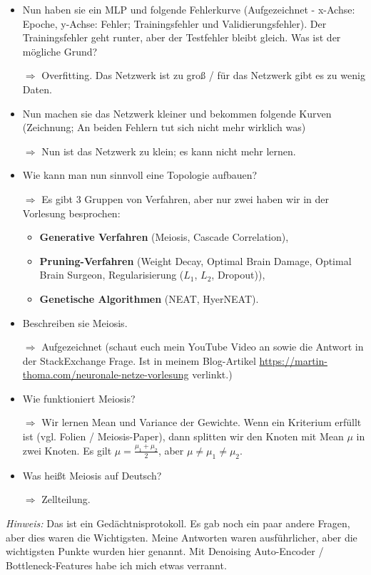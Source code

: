 \documentclass[a4paper]{article}
\begin{document}
\pagebreak
    \begin{itemize}
        \item Nun haben sie ein MLP und folgende Fehlerkurve (Aufgezeichnet - x-Achse: Epoche, y-Achse: Fehler; Trainingsfehler und Validierungsfehler). Der Trainingsfehler
              geht runter, aber der Testfehler bleibt gleich. Was ist der mögliche Grund?
        \item[$\Rightarrow$] Overfitting. Das Netzwerk ist zu groß / für das
                             Netzwerk gibt es zu wenig Daten.
        \item Nun machen sie das Netzwerk kleiner und bekommen folgende Kurven
              (Zeichnung; An beiden Fehlern tut sich nicht mehr wirklich was)
        \item[$\Rightarrow$] Nun ist das Netzwerk zu klein; es kann nicht mehr
                             lernen.
        \item Wie kann man nun sinnvoll eine Topologie aufbauen?
        \item[$\Rightarrow$] Es gibt 3 Gruppen von Verfahren, aber nur zwei
                             haben wir in der Vorlesung besprochen:
             \begin{itemize}
                 \item \textbf{Generative Verfahren} (Meiosis, Cascade Correlation),
                 \item \textbf{Pruning-Verfahren} (Weight Decay, Optimal Brain Damage,
             Optimal Brain Surgeon, Regularisierung ($L_1$, $L_2$, Dropout)),
                 \item \textbf{Genetische Algorithmen} (NEAT, HyerNEAT).
             \end{itemize}
        \item Beschreiben sie Meiosis.
        \item[$\Rightarrow$] Aufgezeichnet (schaut euch mein YouTube Video an
                             sowie die Antwort in der StackExchange Frage.
                             Ist in meinem Blog-Artikel
                             \url{https://martin-thoma.com/neuronale-netze-vorlesung}
                             verlinkt.)
        \item Wie funktioniert Meiosis?
        \item[$\Rightarrow$] Wir lernen Mean und Variance der Gewichte. Wenn
                             ein Kriterium erfüllt ist (vgl. Folien / Meiosis-Paper), dann
                             splitten wir den Knoten mit Mean $\mu$ in zwei
                             Knoten. Es gilt $\mu = \frac{\mu_1 + \mu_2}{2}$,
                             aber $\mu \neq \mu_1 \neq \mu_2$.
        \item Was heißt Meiosis auf Deutsch?
        \item[$\Rightarrow$] Zellteilung.
    \end{itemize}

    \textit{Hinweis:} Das ist ein Gedächtnisprotokoll. Es gab noch ein paar
    andere Fragen, aber dies waren die Wichtigsten. Meine Antworten waren
    ausführlicher, aber die wichtigsten Punkte wurden hier genannt.
    Mit Denoising Auto-Encoder / Bottleneck-Features habe ich mich etwas
    verrannt.
\end{document}
